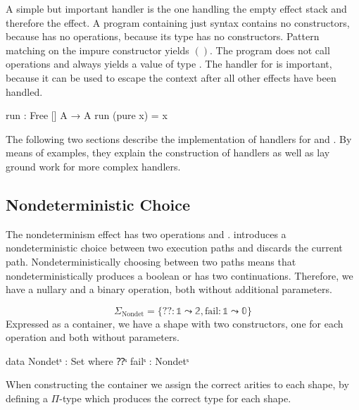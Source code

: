 A simple but important handler is the one handling the empty effect stack and
therefore the  effect.
A program containing just  syntax contains no
 constructors, because  has
no operations, because its  type has no constructors.
Pattern matching on the impure constructor yields $()$.
The program does not call  operations and
always yields a value of type .
The handler for  is important, because it can be used to
escape the  context after all other effects have been
handled.

\begin{code}
run : Free [] A → A
run (pure x) = x
\end{code}

The following two sections describe the implementation of handlers for
 and .
By means of examples, they explain the construction of handlers as well as
lay ground work for more complex handlers.


\subsection{Nondeterministic Choice}
\label{nondeterminism}

The nondeterminism effect has two operations  and
.
 introduces a nondeterministic choice between two execution
paths and  discards the current path.
Nondeterministically choosing between two paths means that 
nondeterministically produces a boolean or has two continuations.
Therefore, we have a nullary and a binary operation, both without additional
parameters.

$$
\Sigma_{\text{Nondet}} = \{ ?\!? : \mathbb{1} \leadsto \mathbb{2}, \mathrm{fail}
: \mathbb{1} \leadsto \mathbb{0} \}
$$
Expressed as a container, we have a shape with two constructors, one for each
operation and both without parameters.

\begin{code}
data Nondetˢ : Set where ⁇ˢ failˢ : Nondetˢ
\end{code}
When constructing the container we assign the correct arities to each shape, by
defining a $\Pi$-type which produces the correct type for each shape.

